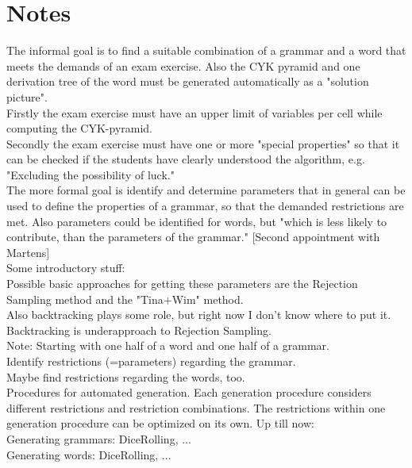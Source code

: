 
\section{Notes}\label{notes}

The informal goal is to find a suitable combination of a grammar and a word that meets the demands of an exam exercise. Also the CYK pyramid and one derivation tree of the word must be generated automatically as a "solution picture".\\
Firstly the exam exercise must have an upper limit of variables per cell while computing the CYK-pyramid.\\
Secondly the exam exercise must have one or more "special properties" so that it can be checked if the students have clearly understood the algorithm, e.g. "Excluding the possibility of luck."\\

\noindent The more formal goal is identify and determine parameters that in general can be used to define the properties of a grammar, so that the demanded restrictions are met. Also parameters could be identified for words, but "which is less likely to contribute, than the parameters of the grammar." [Second appointment with Martens] \\

\noindent Some introductory stuff:\\


\noindent Possible basic approaches for getting these parameters are the Rejection Sampling method and the "Tina+Wim" method. \\
Also backtracking plays some role, but right now I don't know where to put it. Backtracking is underapproach to Rejection Sampling. \\
Note: Starting with one half of a word and one half of a grammar.\\ 

\noindent Identify restrictions (=parameters) regarding the grammar.\\
Maybe find restrictions regarding the words, too.\\

\noindent Procedures for automated generation. Each generation procedure considers different restrictions and restriction combinations. The restrictions within one generation procedure can be optimized on its own. Up till now: \\
Generating grammars: DiceRolling, ...\\
Generating words: DiceRolling, ...\\

